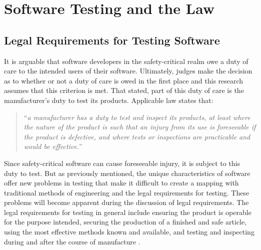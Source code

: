 \chapter{Software Testing and the Law}\label{C:Software}

\section{Legal Requirements for Testing Software}

It is arguable that software developers in the safety-critical realm owe a duty
of care to the intended users of their software. Ultimately, judges make the
decision as to whether or not a duty of care is owed in the first place
\cite{Dobbs01} and this research assumes that this criterion is met. That
stated, part of this duty of care is the manufacturer's duty to test its
products. Applicable law states that:

\begin{quote}
``\textit{a manufacturer has a duty to test and inspect its products, at least
where the nature of the product is such that an injury from its use is 
foreseeable if the product is defective, and where tests or inspections are 
practicable and would be effective.}'' \cite{Testing2005}
\end{quote}

Since safety-critical software can cause foreseeable injury, it is subject to
this duty to test. But as previously mentioned, the unique characteristics of
software offer new problems in testing that make it difficult to create a
mapping with traditional methods of engineering and the legal requirements for
testing. These problems will become apparent during the discussion of legal
requirements. The legal requirements for testing in general include ensuring the
product is operable for the purpose intended, securing the production of a
finished and safe article, using the most effective methods known and available,
and testing and inspecting during and after the course of manufacture
\cite{Testing2005}.

